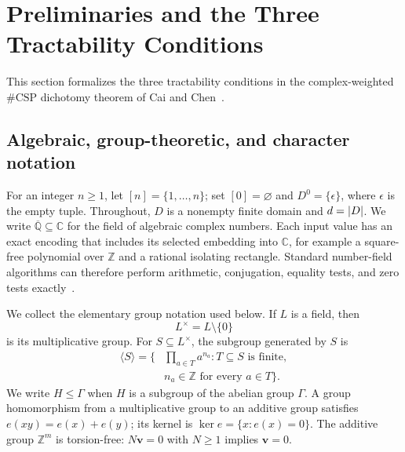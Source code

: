\documentclass[11pt]{article}
\theoremstyle{plain}
\theoremstyle{definition}
\theoremstyle{remark}
\newcommand{\AlgNums}{\overline{\mathbb Q}}
\newcommand{\emptytuple}{\epsilon}
\DeclarePairedDelimiter{\abs}{\lvert}{\rvert}
\begin{document}
\section{Preliminaries and the Three Tractability Conditions}
\label{sec:preliminaries}

This section formalizes the three tractability conditions in the
complex-weighted $\#\mathrm{CSP}$ dichotomy theorem of Cai and
Chen~\cite[Sections~2.8--2.9 and~3.1]{CaiChen2017}.

\subsection{Algebraic, group-theoretic, and character notation}

For an integer $n\ge 1$, let $[n]=\{1,\ldots,n\}$; set
$[0]=\varnothing$ and $D^0=\{\emptytuple\}$, where $\emptytuple$ is the empty
tuple.  Throughout, $D$ is a nonempty finite domain and $d=\abs D$.
We write $\AlgNums\subseteq\mathbb C$ for the field of algebraic complex
numbers.  Each input value has an exact encoding that includes its selected
embedding into $\mathbb C$, for example a square-free polynomial over
$\mathbb Z$ and a rational isolating rectangle.  Standard number-field
algorithms can therefore perform arithmetic, conjugation, equality tests,
and zero tests exactly~\cite{Cohen1993}.

We collect the elementary group notation used below.  If $L$ is a field,
then
\[
  L^\times=L\setminus\{0\}
\]
is its multiplicative group.  For $S\subseteq L^\times$, the subgroup
generated by $S$ is
\[
  \begin{aligned}
  \langle S\rangle
  =\biggl\{&\prod_{a\in T}a^{n_a}:
      T\subseteq S\text{ is finite},\\
      &n_a\in\mathbb Z\text{ for every }a\in T\biggr\}.
  \end{aligned}
\]
We write $H\le\Gamma$ when $H$ is a subgroup of the abelian group
$\Gamma$.  A group homomorphism from a multiplicative group to an additive
group satisfies $e(xy)=e(x)+e(y)$; its kernel is
$\ker e=\{x:e(x)=0\}$.  The additive group $\mathbb Z^m$ is torsion-free:
$N\mathbf v=0$ with $N\ge1$ implies $\mathbf v=0$.
\end{document}
